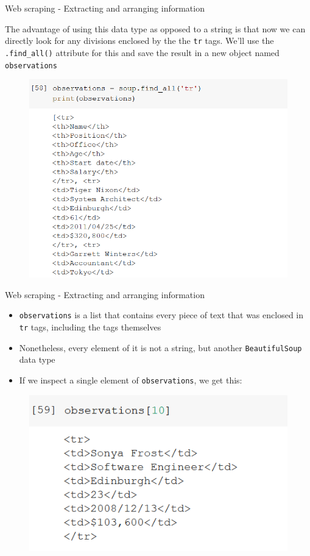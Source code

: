 \documentclass[aspectratio=169]{beamer}
\begin{document}
\begin{frame}{Web scraping - Extracting and arranging information}

	The advantage of using this data type as opposed to a string is that now we can directly look for any divisions enclosed by the the \texttt{tr} tags. We'll use the \texttt{.find\_all()} attribute for this and save the result in a new object named \texttt{observations}

	\begin{figure}
		\centering
		\includegraphics[width=0.45\linewidth]{img/tr_list.png}
	\end{figure}

\end{frame}

\begin{frame}{Web scraping - Extracting and arranging information}

	\begin{itemize}
		\item \texttt{observations} is a list that contains every piece of text that was enclosed in \texttt{tr} tags, including the tags themselves
		\item Nonetheless, every element of it is not a string, but another \texttt{BeautifulSoup} data type
		\item If we inspect a single element of \texttt{observations}, we get this:
	\end{itemize}

	\begin{figure}
		\centering
		\includegraphics[width=0.5\linewidth]{img/tr_list_element.png}
	\end{figure}

\end{frame}
\end{document}
